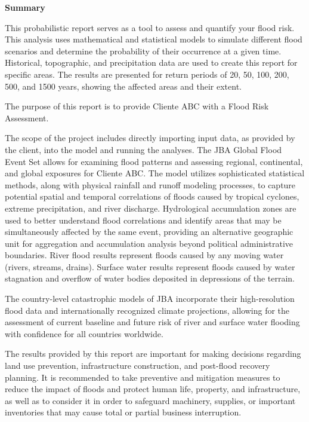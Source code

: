 \documentclass[
]{article}
\begin{document}
\newpage

\noindent \textbf{\textcolor{azuloscuro}{\fontsize{28}{32}\selectfont Summary}}
\label{sec:summary} \vspace{0.5cm}

\fontsize{11}{13}\selectfont This probabilistic report serves as a tool
to assess and quantify your flood risk. This analysis uses mathematical
and statistical models to simulate different flood scenarios and
determine the probability of their occurrence at a given time.
Historical, topographic, and precipitation data are used to create this
report for specific areas. The results are presented for return periods
of 20, 50, 100, 200, 500, and 1500 years, showing the affected areas and
their extent.

\fontsize{11}{13}\selectfont The purpose of this report is to provide
Cliente ABC with a Flood Risk Assessment.

\fontsize{11}{13}\selectfont The scope of the project includes directly
importing input data, as provided by the client, into the model and
running the analyses. The JBA Global Flood Event Set allows for
examining flood patterns and assessing regional, continental, and global
exposures for Cliente ABC. The model utilizes sophisticated statistical
methods, along with physical rainfall and runoff modeling processes, to
capture potential spatial and temporal correlations of floods caused by
tropical cyclones, extreme precipitation, and river discharge.
Hydrological accumulation zones are used to better understand flood
correlations and identify areas that may be simultaneously affected by
the same event, providing an alternative geographic unit for aggregation
and accumulation analysis beyond political administrative boundaries.
River flood results represent floods caused by any moving water (rivers,
streams, drains). Surface water results represent floods caused by water
stagnation and overflow of water bodies deposited in depressions of the
terrain.

\fontsize{11}{13}\selectfont The country-level catastrophic models of
JBA incorporate their high-resolution flood data and internationally
recognized climate projections, allowing for the assessment of current
baseline and future risk of river and surface water flooding with
confidence for all countries worldwide.

\fontsize{11}{13}\selectfont The results provided by this report are
important for making decisions regarding land use prevention,
infrastructure construction, and post-flood recovery planning. It is
recommended to take preventive and mitigation measures to reduce the
impact of floods and protect human life, property, and infrastructure,
as well as to consider it in order to safeguard machinery, supplies, or
important inventories that may cause total or partial business
interruption.
\end{document}
